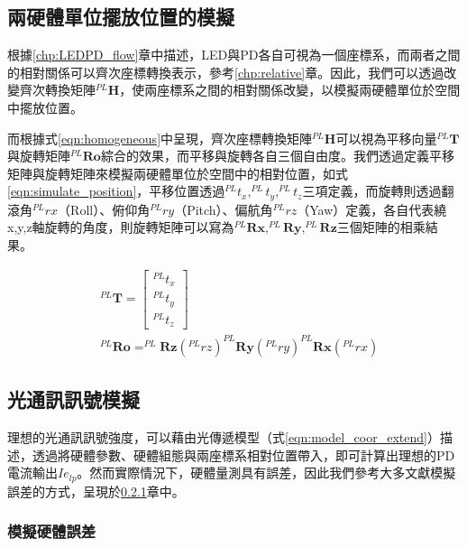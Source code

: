 \subsection{兩硬體單位擺放位置的模擬}
\label{chp:simulate_position}



根據\ref{chp:LEDPD_flow}章中描述，LED與PD各自可視為一個座標系，而兩者之間的相對關係可以齊次座標轉換表示，參考\ref{chp:relative}章。因此，我們可以透過改變齊次轉換矩陣$^{PL}\boldsymbol{H}$，使兩座標系之間的相對關係改變，以模擬兩硬體單位於空間中擺放位置。

而根據式\ref{eqn:homogeneous}中呈現，齊次座標轉換矩陣$^{PL}\boldsymbol{H}$可以視為平移向量$^{PL}\boldsymbol{T}$與旋轉矩陣$^{PL}\boldsymbol{Ro}$綜合的效果，而平移與旋轉各自三個自由度。我們透過定義平移矩陣與旋轉矩陣來模擬兩硬體單位於空間中的相對位置，如式\ref{eqn:simulate_position}，平移位置透過$^{PL}t_x,^{PL}t_y,^{PL}t_z$三項定義，而旋轉則透過翻滾角$^{PL}rx$（Roll）、俯仰角$^{PL}ry$（Pitch）、偏航角$^{PL}rz$（Yaw）定義，各自代表繞x,y,z軸旋轉的角度，則旋轉矩陣可以寫為$^{PL}\boldsymbol{Rx},^{PL}\boldsymbol{Ry},^{PL}\boldsymbol{Rz}$三個矩陣的相乘結果。

\begin{equation}
    \label{eqn:simulate_position}
    \begin{aligned}
    &^{PL}\boldsymbol{T} = 
    \left[\begin{array}{c}
        ^{PL}t_x \\^{PL}t_y\\^{PL}t_z
    \end{array}\right]\\
    &^{PL}\boldsymbol{Ro} = 
    ^{PL}\boldsymbol{Rz} (^{PL}rz)^{PL}\boldsymbol{Ry}(^{PL}ry) ^{PL}\boldsymbol{Rx} (^{PL}rx)
    \end{aligned}
\end{equation}

\subsection{光通訊訊號模擬}
\label{chp:simulate_vlc}

    理想的光通訊訊號強度，可以藉由光傳遞模型（式\ref{eqn:model_coor_extend}）描述，透過將硬體參數、硬體組態與兩座標系相對位置帶入，即可計算出理想的PD電流輸出$Ie_{lp}$。然而實際情況下，硬體量測具有誤差，因此我們參考大多文獻模擬誤差的方式，呈現於\ref{chp:hardware_error}章中。

    \subsubsection{模擬硬體誤差}
    \label{chp:hardware_error}

